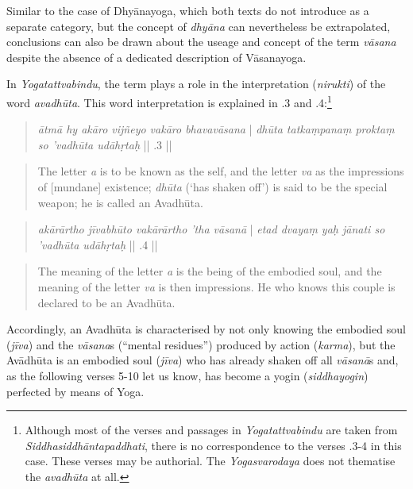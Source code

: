 Similar to the case of Dhyānayoga, which both texts do not introduce as a separate category, but the concept of \textit{dhyāna} can nevertheless be extrapolated, conclusions can also be drawn about the useage and concept of the term \textit{vāsana} despite the absence of a dedicated description of Vāsanayoga.

In \textit{Yogatattvabindu}, the term plays a role in the interpretation (\textit{nirukti}) of the word \textit{avadhūta}. This word interpretation is explained in .3 and .4:\footnote{Although most of the verses and passages in \textit{Yogatattvabindu}  are taken from \textit{Siddhasiddhāntapaddhati}, there is no correspondence to the verses .3-4 in this case. These verses may be authorial. The \textit{Yogasvarodaya} does not thematise the \textit{avadhūta} at all.}

\begin{quote}
  \textit{ātmā hy akāro vijñeyo vakāro bhavavāsana} |
  \textit{dhūta tatkaṃpanaṃ proktaṃ so 'vadhūta udāhṛtaḥ} || .3 ||
\end{quote}

\begin{quote}
  The letter \textit{a} is to be known as the self, and the letter \textit{va} as the impressions of [mundane] existence; \textit{dhūta} (`has shaken off') is said to be the special weapon; he is called an Avadhūta.
\end{quote}

\begin{quote}
  \textit{akārārtho jīvabhūto vakārārtho 'tha vāsanā} |
  \textit{etad dvayaṃ yaḥ jānati so 'vadhūta udāhṛtaḥ} || .4 ||
    \end{quote}

    \begin{quote}
      The meaning of the letter \textit{a} is the being of the embodied soul, and the meaning of the letter \textit{va} is then impressions. He who knows this couple is declared to be an Avadhūta.
    \end{quote}
    
    Accordingly, an Avadhūta is characterised by not only knowing the embodied soul (\textit{jīva}) and the \textit{vāsana}s (``mental residues'') produced by action (\textit{karma}), but the Avādhūta is an embodied soul (\textit{jīva}) who has already shaken off all \textit{vāsanā}s and, as the following verses  5-10 let us know, has become a yogin (\textit{siddhayogin}) perfected by means of Yoga. \\
    
